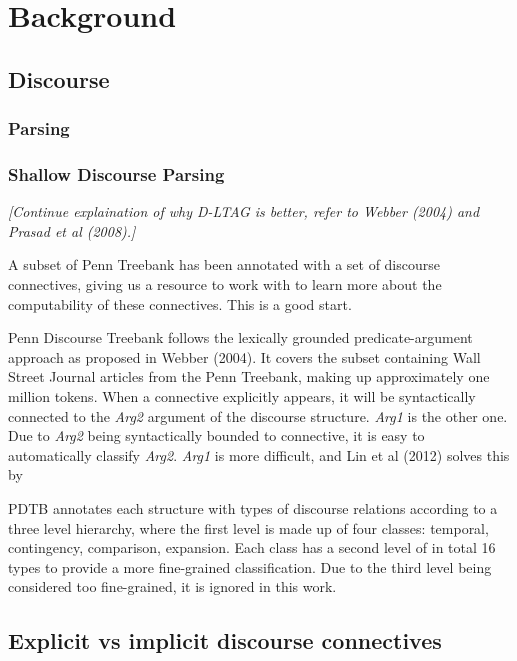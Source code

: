 
\chapter{Background}

\section{Discourse}

\subsection{Parsing}

\subsection{Shallow Discourse Parsing}

\emph{[Continue explaination of why D-LTAG is better, refer to Webber (2004) and Prasad et al (2008).]}

A subset of Penn Treebank has been annotated with a set of discourse connectives, giving us a resource to work with to learn more about the computability of these connectives. This is a good start.

Penn Discourse Treebank follows the lexically grounded predicate-argument approach as proposed in Webber (2004). It covers the subset containing Wall Street Journal articles from the Penn Treebank, making up approximately one million tokens. When a connective explicitly appears, it will be syntactically connected to the \emph{Arg2} argument of the discourse structure. \emph{Arg1} is the other one. Due to \emph{Arg2} being syntactically bounded to connective, it is easy to automatically classify \emph{Arg2}. \emph{Arg1} is more difficult, and Lin et al (2012) solves this by

PDTB annotates each structure with types of discourse relations according to a three level hierarchy, where the first level is made up of four classes: temporal, contingency, comparison, expansion. Each class has a second level of in total 16 types to provide a more fine-grained classification. Due to the third level being considered too fine-grained, it is ignored in this work.

\section{Explicit vs implicit discourse connectives}



